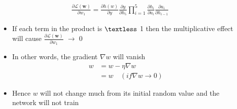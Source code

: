 	\begin{frame}
		\begin{columns}
			\begin{center}
				
			\end{center}
			
			\begin{overlayarea}{\textwidth}{\textheight}
				\vspace{0.1cm}
				
				
				\begin{align*}
					\frac{\partial \mathscr{L}(\textbf{w})} {\partial w_1} = \frac{\partial h(w)}{\partial y} \frac{\partial y}{\partial h_5} {\prod_{i=1}^{5} }\frac{\partial h_i}{\partial a_i}  \frac{\partial a_i }{\partial h_{i-1}} 
				\end{align*}
				
				
				
				\begin{itemize}[<+(1)->]
					\justifying
					\item If each term in the product is $\textless$ 1 then the multiplicative effect will cause 
					      $\frac{\partial \mathscr{L}(\textbf{w})} {\partial w_1}$   $\rightarrow$ 0   
					\item In other words, the gradient $\nabla w $ will vanish
					      \begin{align*}
					      	w & = w-\eta\nabla w                    \\ 
					      	  & =w \quad (if \nabla w\rightarrow 0) 
					      \end{align*}
					\item Hence $w$ will not change much from its initial random value and the network will not train
				\end{itemize}
				
				
			\end{overlayarea}
		\end{columns}
		
	\end{frame}
\fi